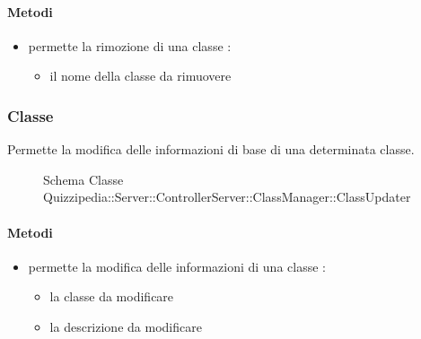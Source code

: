 \paragraph{Metodi}
\begin{itemize}
\item {}
\newline
permette la rimozione di una classe
\newline
{} :
\begin{itemize}
\item {}
\newline
il nome della classe da rimuovere
\end{itemize}
\end{itemize}
\subsubsection{Classe }
Permette la modifica delle informazioni di base di una determinata classe.
\begin{figure}[H]
\centering
\noindent{}
\caption[Schema Classe ClassUpdater]{Schema Classe Quizzipedia::Server::ControllerServer::ClassManager::ClassUpdater}
\end{figure}
\paragraph{Metodi}
\begin{itemize}
\item {}
\newline
permette la modifica delle informazioni di una classe
\newline
{} :
\begin{itemize}
\item {}
\newline
la classe da modificare
\item {}
\newline
la descrizione da modificare
\end{itemize}
\end{itemize}
